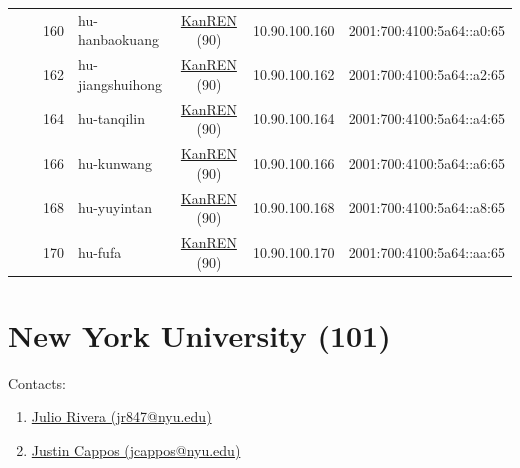 \begin{small}
\begin{center}
\begin{longtable}{|c|c|c|c|c|c|c|c|}
  &  & \tiny{160} & \multicolumn{1}{|l|}{\tiny{hu-hanbaokuang}} & \multicolumn{2}{|c|}{\tiny{\href{http://www.kanren.net}{KanREN} (90)}} & \tiny{10.90.100.160} & \tiny{2001:700:4100:5a64::a0:65} \\* \cline{3-3}\cline{4-4}\cline{5-5}\cline{6-6}\cline{7-7}\cline{8-8}
  &  & \tiny{162} & \multicolumn{1}{|l|}{\tiny{hu-jiangshuihong}} & \multicolumn{2}{|c|}{\tiny{\href{http://www.kanren.net}{KanREN} (90)}} & \tiny{10.90.100.162} & \tiny{2001:700:4100:5a64::a2:65} \\* \cline{3-3}\cline{4-4}\cline{5-5}\cline{6-6}\cline{7-7}\cline{8-8}
  &  & \tiny{164} & \multicolumn{1}{|l|}{\tiny{hu-tanqilin}} & \multicolumn{2}{|c|}{\tiny{\href{http://www.kanren.net}{KanREN} (90)}} & \tiny{10.90.100.164} & \tiny{2001:700:4100:5a64::a4:65} \\* \cline{3-3}\cline{4-4}\cline{5-5}\cline{6-6}\cline{7-7}\cline{8-8}
  &  & \tiny{166} & \multicolumn{1}{|l|}{\tiny{hu-kunwang}} & \multicolumn{2}{|c|}{\tiny{\href{http://www.kanren.net}{KanREN} (90)}} & \tiny{10.90.100.166} & \tiny{2001:700:4100:5a64::a6:65} \\* \cline{3-3}\cline{4-4}\cline{5-5}\cline{6-6}\cline{7-7}\cline{8-8}
  &  & \tiny{168} & \multicolumn{1}{|l|}{\tiny{hu-yuyintan}} & \multicolumn{2}{|c|}{\tiny{\href{http://www.kanren.net}{KanREN} (90)}} & \tiny{10.90.100.168} & \tiny{2001:700:4100:5a64::a8:65} \\* \cline{3-3}\cline{4-4}\cline{5-5}\cline{6-6}\cline{7-7}\cline{8-8}
  &  & \tiny{170} & \multicolumn{1}{|l|}{\tiny{hu-fufa}} & \multicolumn{2}{|c|}{\tiny{\href{http://www.kanren.net}{KanREN} (90)}} & \tiny{10.90.100.170} & \tiny{2001:700:4100:5a64::aa:65} \\ \hline
\end{longtable}
\end{center}
\end{small}



\section{New York University (101)}
\label{sec:NYU}

Contacts:\begin{enumerate}
 \item {}\href{mailto:jr847@nyu.edu}{Julio Rivera (jr847@nyu.edu)}
 \item {}\href{mailto:jcappos@nyu.edu}{Justin Cappos (jcappos@nyu.edu)}
\end{enumerate}

